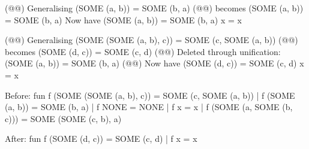 \begin{example}
\begin{narrow}{-3em}{0em}
\begin{multicols}{2}
\begin{sml}
(@@)
Generalising
  (SOME (a, b)) = SOME (b, a)
(@@)
becomes
  (SOME (a, b)) = SOME (b, a)
Now have
  (SOME (a, b)) = SOME (b, a)
  x = x

(@@)
Generalising
  (SOME (SOME (a, b), c)) = SOME (c, SOME (a, b))
(@@)
becomes
  (SOME (d, c)) = SOME (c, d)
(@@)
Deleted through unification:
  (SOME (a, b)) = SOME (b, a)
(@@)
Now have
  (SOME (d, c)) = SOME (c, d)
  x = x

Before:
fun f (SOME (SOME (a, b), c)) = SOME (c, SOME (a, b))
  | f (SOME (a, b)) = SOME (b, a)
  | f NONE = NONE
  | f x = x
  | f (SOME (a, SOME (b, c))) = SOME (SOME (c, b), a)

After:
fun f (SOME (d, c)) = SOME (c, d)
  | f x = x      
    \end{sml}
    \end{multicols}
  \end{narrow}
\end{example}


